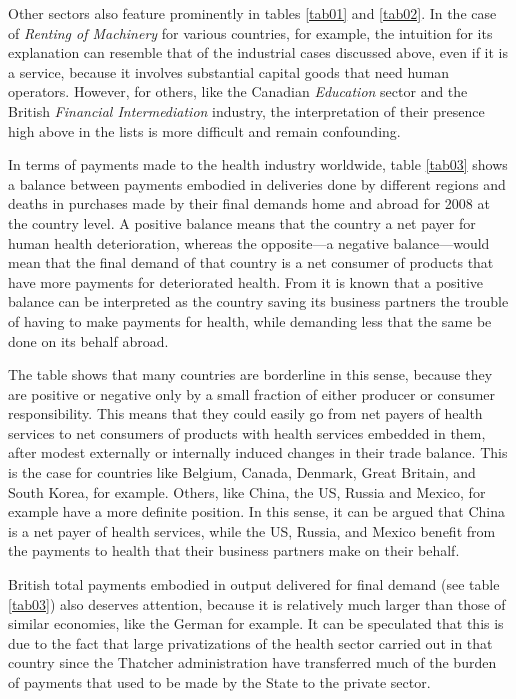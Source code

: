\documentclass[a4paper,12pt]{article}
\begin{document}
Other sectors also feature prominently in tables \ref{tab01} and \ref{tab02}. In the case of \textit{Renting of Machinery} for various countries, for example, the intuition for its explanation can resemble that of the industrial cases discussed above, even if it is a service,  because it involves substantial capital goods that need human operators. However, for others, like the Canadian \textit{Education} sector and the British \textit{Financial Intermediation} industry, the interpretation of their presence high above in the lists is more difficult and remain confounding. 

In terms of payments made to the health industry worldwide, table \ref{tab03} shows a balance between payments embodied in deliveries done by different regions and deaths in purchases made by their final demands home and abroad for 2008 at the country level. A positive balance means that the country a net payer for human health deterioration, whereas the opposite---a negative balance---would mean that the final demand of that country is a net consumer of products that have more payments for deteriorated health. From \citet{serranodietz2010} it is known that a positive balance can be interpreted as the country saving its business partners the trouble of having to make payments for health, while demanding less that the same be done on its behalf abroad.

The table shows that many countries are borderline in this sense, because they are positive or negative only by a small fraction of either producer or consumer responsibility. This means that they could easily go from net payers of health services to net consumers of products with health services embedded in them, after modest externally or internally induced changes in their trade balance. This is the case for countries like Belgium, Canada, Denmark, Great Britain, and South Korea, for example. Others, like China, the US, Russia and Mexico, for example have a more definite position. In this sense, it can be argued that China is a net payer of health services, while the US, Russia, and Mexico benefit from the payments to health that their business partners make on their behalf.

British total payments embodied in output delivered for final demand (see table \ref{tab03}) also deserves attention, because it is relatively much larger than those of similar economies, like the German for example. It can be speculated that this is due to the fact that large privatizations of the health sector carried out in that country since the Thatcher administration have transferred much of the burden of payments that used to be made by the State to the private sector.
\end{document}
